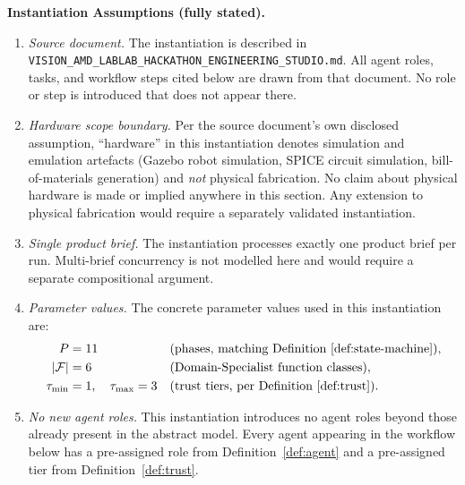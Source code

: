 \documentclass[12pt]{article}
\theoremstyle{definition}
\newcommand{\code}[1]{\texttt{#1}}
\newcommand{\VisionHackathon}{\code{VISION\_AMD\_\allowbreak LABLAB\_\allowbreak HACKATHON\_\allowbreak ENGINEERING\_STUDIO.md}}
\begin{document}
\medskip
\noindent\textbf{Instantiation Assumptions (fully stated).}
\begin{enumerate}
    \item[A1] \emph{Source document.}  The instantiation is described in
              \VisionHackathon{}.  All agent roles, tasks, and
              workflow steps cited below are drawn from that document.
              No role or step is introduced that does not appear there.

    \item[A2] \emph{Hardware scope boundary.}  Per the source document's
              own disclosed assumption, ``hardware'' in this instantiation
              denotes simulation and emulation artefacts (Gazebo robot
              simulation, SPICE circuit simulation, bill-of-materials
              generation) and \emph{not} physical fabrication.  No claim
              about physical hardware is made or implied anywhere in this
              section.  Any extension to physical fabrication would
              require a separately validated instantiation.

    \item[A3] \emph{Single product brief.}  The instantiation processes
              exactly one product brief per run.  Multi-brief concurrency
              is not modelled here and would require a separate
              compositional argument.

    \item[A4] \emph{Parameter values.}  The concrete parameter values
              used in this instantiation are:
              \begin{align}
                  P       &= 11
                  &&\text{(phases, matching Definition~\ref{def:state-machine})},
                  \notag\\
                  |\mathcal{F}| &= 6
                  &&\text{(Domain-Specialist function classes)},
                  \notag\\
                  \tau_{\mathrm{min}} &= 1,\quad \tau_{\mathrm{max}} = 3
                  &&\text{(trust tiers, per Definition~\ref{def:trust})}.
                  \notag
              \end{align}

    \item[A5] \emph{No new agent roles.}  This instantiation introduces
              no agent roles beyond those already present in the abstract
              model.  Every agent appearing in the workflow below has a
              pre-assigned role from Definition~\ref{def:agent} and a
              pre-assigned tier from Definition~\ref{def:trust}.
\end{enumerate}
\end{document}
